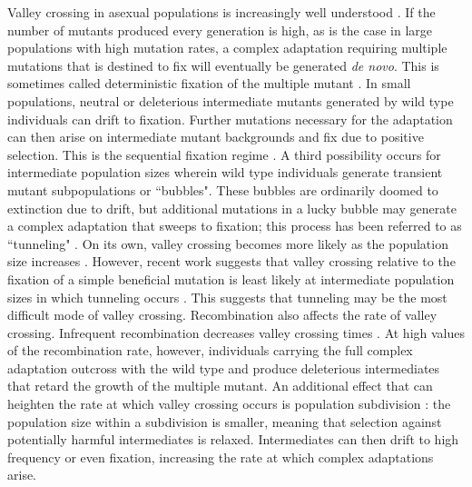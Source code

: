 \documentclass[10pt,twocolumn,twoside]{gsajnl}
\begin{document}
\begin{spacing}{1.5}
Valley crossing in asexual populations is increasingly well understood \citep{weissman_2009}.
If the number of mutants produced every generation is high, as is the case in large populations with high mutation rates, a complex adaptation requiring multiple mutations that is destined to fix will eventually be generated \emph{de novo}.
This is sometimes called deterministic fixation of the multiple mutant \citep{weissman_2009}.
In small populations, neutral or deleterious intermediate mutants generated by wild type individuals can drift to fixation. Further mutations necessary for the adaptation can then arise on intermediate mutant backgrounds and fix due to positive selection.
This is the sequential fixation regime \citep{weissman_2009}.
A third possibility occurs for intermediate population sizes wherein wild type individuals generate transient mutant subpopulations or ``bubbles".
These bubbles are ordinarily doomed to extinction due to drift, but additional mutations in a lucky bubble may generate a complex adaptation that sweeps to fixation; this process has been referred to as ``tunneling" \citep{iwasa_2004, weissman_2009}.
On its own, valley crossing becomes more likely as the population size increases \citep{weissman_2009}.
However, recent work suggests that valley crossing relative to the fixation of a simple beneficial mutation is least likely at intermediate population sizes in which tunneling occurs \citet{ochs_2015}.
This suggests that tunneling may be the most difficult mode of valley crossing. 
Recombination also affects the rate of valley crossing.
Infrequent recombination decreases valley crossing times \citep{weissman_2010}.
At high values of the recombination rate, however, individuals carrying the full complex adaptation outcross with the wild type and produce deleterious intermediates that retard the growth of the multiple mutant.
An additional effect that can heighten the rate at which valley crossing occurs is population subdivision \citep{Bitbol:Schwab:2014}: the population size within a subdivision is smaller, meaning that selection against potentially harmful intermediates is relaxed.
Intermediates can then drift to high frequency or even fixation, increasing the rate at which complex adaptations arise.


\end{spacing}
\end{document}
